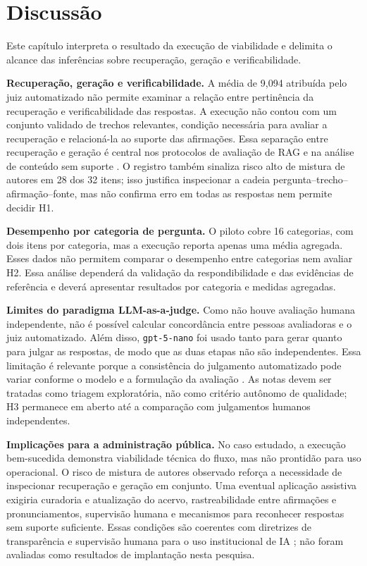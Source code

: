\section{Discussão}
\label{sec:discussao}

Este capítulo interpreta o resultado da execução de viabilidade e delimita o alcance das inferências sobre recuperação, geração e verificabilidade.

\noindent\textbf{Recuperação, geração e verificabilidade.} A média de 9,094 atribuída pelo juiz automatizado não permite examinar a relação entre pertinência da recuperação e verificabilidade das respostas. A execução não contou com um conjunto validado de trechos relevantes, condição necessária para avaliar a recuperação e relacioná-la ao suporte das afirmações. Essa separação entre recuperação e geração é central nos protocolos de avaliação de RAG e na análise de conteúdo sem suporte \parencite{saadFalconEtAl2024ares,esEtAl2023ragas,niuEtAl2024ragtruth}. O registro também sinaliza risco alto de mistura de autores em 28 dos 32 itens; isso justifica inspecionar a cadeia pergunta--trecho--afirmação--fonte, mas não confirma erro em todas as respostas nem permite decidir H1.

\noindent\textbf{Desempenho por categoria de pergunta.} O piloto cobre 16 categorias, com dois itens por categoria, mas a execução reporta apenas uma média agregada. Esses dados não permitem comparar o desempenho entre categorias nem avaliar H2. Essa análise dependerá da validação da respondibilidade e das evidências de referência e deverá apresentar resultados por categoria e medidas agregadas.

\noindent\textbf{Limites do paradigma LLM-as-a-judge.} Como não houve avaliação humana independente, não é possível calcular concordância entre pessoas avaliadoras e o juiz automatizado. Além disso, \texttt{gpt-5-nano} foi usado tanto para gerar quanto para julgar as respostas, de modo que as duas etapas não são independentes. Essa limitação é relevante porque a consistência do julgamento automatizado pode variar conforme o modelo e a formulação da avaliação \parencite{liuEtAl2025judgeRag}. As notas devem ser tratadas como triagem exploratória, não como critério autônomo de qualidade; H3 permanece em aberto até a comparação com julgamentos humanos independentes.

\noindent\textbf{Implicações para a administração pública.} No caso estudado, a execução bem-sucedida demonstra viabilidade técnica do fluxo, mas não prontidão para uso operacional. O risco de mistura de autores observado reforça a necessidade de inspecionar recuperação e geração em conjunto. Uma eventual aplicação assistiva exigiria curadoria e atualização do acervo, rastreabilidade entre afirmações e pronunciamentos, supervisão humana e mecanismos para reconhecer respostas sem suporte suficiente. Essas condições são coerentes com diretrizes de transparência e supervisão humana para o uso institucional de IA \parencite{ipu2024aiParliaments,wfd2023guidelinesAiParliaments,deAlmeidaSantos2025aiGovernance}; não foram avaliadas como resultados de implantação nesta pesquisa.

